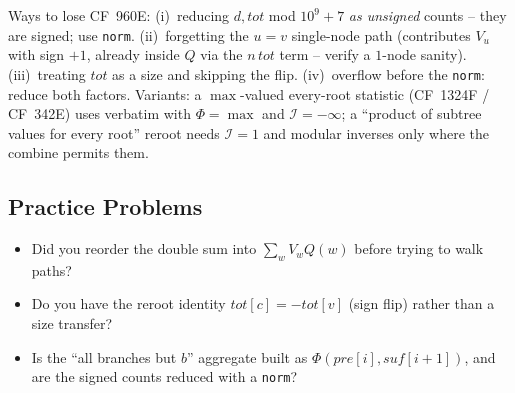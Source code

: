 
\begin{warningbox}
Ways to lose CF~960E: (i)~reducing $d,\mathit{tot}$ mod $10^9{+}7$ \emph{as
unsigned} counts -- they are signed; use \lstinline{norm}. (ii)~forgetting the
$u=v$ single-node path (contributes $V_u$ with sign $+1$, already inside $Q$ via
the $n\,\mathit{tot}$ term -- verify a $1$-node sanity). (iii)~treating
$\mathit{tot}$ as a size and skipping the flip. (iv)~overflow before the
\lstinline{norm}: reduce both factors. Variants: a $\max$-valued every-root
statistic (CF~1324F / CF~342E) uses  verbatim with
$\Phi=\max$ and $\mathcal{I}=-\infty$; a ``product of subtree values for every
root'' reroot needs $\mathcal{I}=1$ and modular inverses only where the combine
permits them.
\end{warningbox}

\subsection{Practice Problems}

\begin{stuckbox}
\begin{itemize}[nosep, leftmargin=1.4em]
  \item Did you reorder the double sum into $\sum_w V_w Q(w)$ before trying to
        walk paths?
  \item Do you have the reroot identity $\mathit{tot}[c]=-\mathit{tot}[v]$ (sign
        flip) rather than a size transfer?
  \item Is the ``all branches but $b$'' aggregate built as
        $\Phi(\mathit{pre}[i],\mathit{suf}[i{+}1])$, and are the signed counts
        reduced with a \lstinline{norm}?
\end{itemize}
\end{stuckbox}

